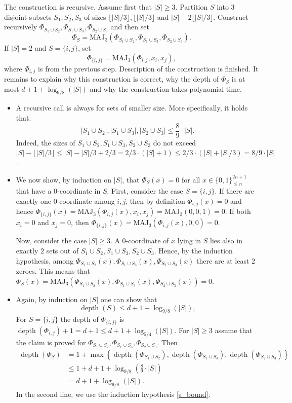 \documentclass{toc}
\def\MAJ{\mathrm{MAJ}}
\DeclareMathOperator{\depth}{depth}  %
\begin{document}
The construction is recursive. Assume first that $|S| \ge 3$. Partition $S$ into $3$ disjoint subsets $S_1, S_2, S_3$ of sizes $\lfloor |S|/3\rfloor, \lfloor |S|/3\rfloor$ and $|S| - 2\lfloor |S|/3\rfloor$. 
 Construct recursively $\Phi_{S_1\cup S_2}, \Phi_{S_1 \cup S_3}, \Phi_{S_2\cup S_3}$ and then set
\[\Phi_S = \MAJ_3\left(\Phi_{S_1\cup S_2}, \Phi_{S_1\cup S_3}, \Phi_{S_2\cup S_3}\right).\]
If $|S| = 2$ and $S = \{i, j\}$, set
\[\Phi_{\{i, j\}} = \MAJ_3(\Phi_{i,j}, x_i, x_j),\]
where $\Phi_{i,j}$ is from the previous step.
Description of the construction is finished. It remains to explain why this construction is correct, why the depth of $\Phi_S$ is at most  $d + 1 + \log_{9/8}(|S|)$ and why the construction takes polynomial time.

\begin{itemize}
\item A recursive call is always for sets of smaller size. More specifically, it holds that:
\begin{equation}
\label{s_bound}
|S_1\cup S_2|, |S_1\cup S_3|, |S_2\cup S_3| \le \frac{8}{9} \cdot |S|.
\end{equation}
Indeed, the sizes of $S_1\cup S_2, S_1\cup S_3, S_2\cup S_3$ do not exceed $|S| - \lfloor|S|/3\rfloor \le |S| - |S|/3 + 2/3 = 2/3\cdot(|S| + 1) \le 2/3\cdot (|S| + |S|/3) = 8/9\cdot |S|$.

\item We now show, by induction on $|S|$, that $\Phi_S(x) = 0$ for all $x\in\{0, 1\}^{2n + 1}_{\le n}$ that have a $0$-coordinate in $S$. First, consider the case $S = \{i, j\}$. If there are exactly one $0$-coordinate among $i, j$, then by definition $\Phi_{i, j}(x) = 0$ and hence $\Phi_{\{i, j\}}(x) = \MAJ_3(\Phi_{i,j}(x), x_i, x_j) = \MAJ_3(0, 0, 1) = 0$. If both $x_i = 0$ and $x_j = 0$, then $\Phi_{\{i, j\}}(x) = \MAJ_3(\Phi_{i,j}(x), 0, 0) = 0$.

Now, consider the case $|S| \ge 3$. A $0$-coordinate of $x$ lying  in $S$ lies also in exactly $2$ sets out of $S_1\cup S_2, S_1\cup S_3, S_2\cup S_3$. Hence,  by the induction hypothesis, among $\Phi_{S_1\cup S_2}(x), \Phi_{S_1\cup S_3}(x), \Phi_{S_2\cup S_3}(x)$ there are at least 2 zeroes. This means that $\Phi_S(x) = \MAJ_3\left(\Phi_{S_1\cup S_2}(x), \Phi_{S_1\cup S_3}(x), \Phi_{S_2\cup S_3}(x)\right) = 0$.

\item Again, by induction on $|S|$ one can show that
\[\depth(S) \le d + 1 + \log_{9/8}(|S|),\]
 For $S = \{i,j\}$ the depth of $\Phi_{\{i,j\}}$ is $\depth(\Phi_{i,j}) + 1 = d + 1 \le d + 1 + \log_{5/4}(|S|)$. For $|S| \ge 3$ assume that the claim is proved for $\Phi_{S_1\cup S_2}, \Phi_{S_1 \cup S_3}, \Phi_{S_2\cup S_3}$. Then
\begin{align*}
\depth(\Phi_S) &= 1 + \max\left\{\depth(\Phi_{S_1\cup S_2}), \depth(\Phi_{S_1\cup S_3}), \depth(\Phi_{S_2\cup S_3})\right\} \\
&\le 1 + d + 1 + \log_{9/8}\left(\frac{8}{9} \cdot |S|\right) \\
&= d + 1 + \log_{9/8}(|S|).
\end{align*}
In the second line, we use the induction hypothesis \eqref{s_bound}.


\end{itemize}
\end{document}
